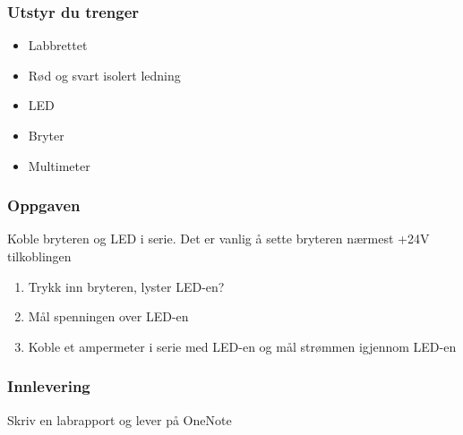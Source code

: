 \subsubsection*{Utstyr du trenger}
\begin{itemize}
\item Labbrettet
\item Rød og svart isolert ledning
\item LED 
\item Bryter
\item Multimeter
\end{itemize}

\subsubsection*{Oppgaven}
Koble bryteren og LED i serie. Det er vanlig å sette bryteren nærmest +24V tilkoblingen
\begin{enumerate}
		
		\item Trykk inn bryteren, lyster LED-en?
		\item Mål spenningen over LED-en 
		\item Koble et ampermeter i serie med LED-en og mål strømmen igjennom LED-en
\end{enumerate}

\subsubsection*{Innlevering}

Skriv en labrapport og lever på OneNote
\vskip 5pt 



